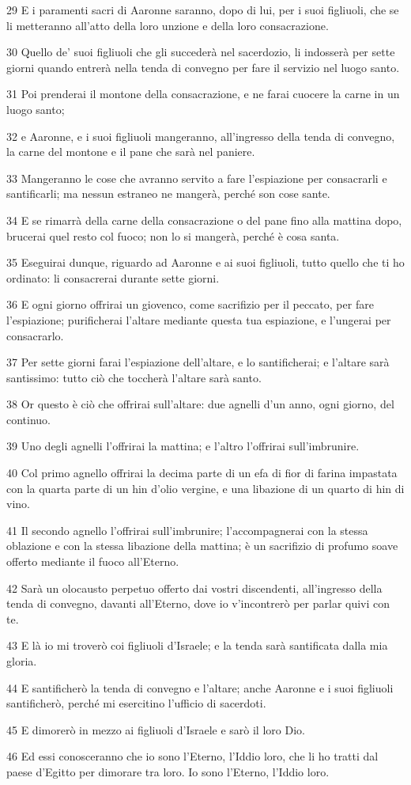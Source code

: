 \par 29 E i paramenti sacri di Aaronne saranno, dopo di lui, per i suoi figliuoli, che se li metteranno all'atto della loro unzione e della loro consacrazione.
\par 30 Quello de' suoi figliuoli che gli succederà nel sacerdozio, li indosserà per sette giorni quando entrerà nella tenda di convegno per fare il servizio nel luogo santo.
\par 31 Poi prenderai il montone della consacrazione, e ne farai cuocere la carne in un luogo santo;
\par 32 e Aaronne, e i suoi figliuoli mangeranno, all'ingresso della tenda di convegno, la carne del montone e il pane che sarà nel paniere.
\par 33 Mangeranno le cose che avranno servito a fare l'espiazione per consacrarli e santificarli; ma nessun estraneo ne mangerà, perché son cose sante.
\par 34 E se rimarrà della carne della consacrazione o del pane fino alla mattina dopo, brucerai quel resto col fuoco; non lo si mangerà, perché è cosa santa.
\par 35 Eseguirai dunque, riguardo ad Aaronne e ai suoi figliuoli, tutto quello che ti ho ordinato: li consacrerai durante sette giorni.
\par 36 E ogni giorno offrirai un giovenco, come sacrifizio per il peccato, per fare l'espiazione; purificherai l'altare mediante questa tua espiazione, e l'ungerai per consacrarlo.
\par 37 Per sette giorni farai l'espiazione dell'altare, e lo santificherai; e l'altare sarà santissimo: tutto ciò che toccherà l'altare sarà santo.
\par 38 Or questo è ciò che offrirai sull'altare: due agnelli d'un anno, ogni giorno, del continuo.
\par 39 Uno degli agnelli l'offrirai la mattina; e l'altro l'offrirai sull'imbrunire.
\par 40 Col primo agnello offrirai la decima parte di un efa di fior di farina impastata con la quarta parte di un hin d'olio vergine, e una libazione di un quarto di hin di vino.
\par 41 Il secondo agnello l'offrirai sull'imbrunire; l'accompagnerai con la stessa oblazione e con la stessa libazione della mattina; è un sacrifizio di profumo soave offerto mediante il fuoco all'Eterno.
\par 42 Sarà un olocausto perpetuo offerto dai vostri discendenti, all'ingresso della tenda di convegno, davanti all'Eterno, dove io v'incontrerò per parlar quivi con te.
\par 43 E là io mi troverò coi figliuoli d'Israele; e la tenda sarà santificata dalla mia gloria.
\par 44 E santificherò la tenda di convegno e l'altare; anche Aaronne e i suoi figliuoli santificherò, perché mi esercitino l'ufficio di sacerdoti.
\par 45 E dimorerò in mezzo ai figliuoli d'Israele e sarò il loro Dio.
\par 46 Ed essi conosceranno che io sono l'Eterno, l'Iddio loro, che li ho tratti dal paese d'Egitto per dimorare tra loro. Io sono l'Eterno, l'Iddio loro.

